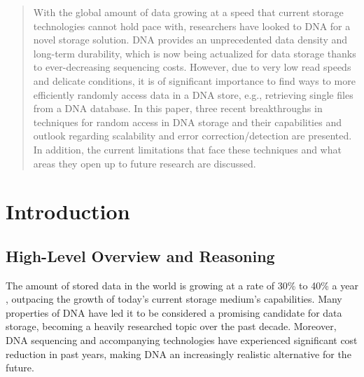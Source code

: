 \documentclass[a4paper,conference]{IEEEtran}
\begin{document}
\begin{abstract}
With the global amount of data growing at a speed that current storage technologies cannot hold pace with, researchers have looked to DNA for a novel storage solution. DNA provides an unprecedented data density and long-term durability, which is now being actualized for data storage thanks to ever-decreasing sequencing costs. However, due to very low read speeds and delicate conditions, it is of significant importance to find ways to more efficiently randomly access data in a DNA store, e.g., retrieving single files from a DNA database. In this paper, three recent breakthroughs in techniques for random access in DNA storage and their capabilities and outlook regarding scalability and error correction/detection are presented. In addition, the current limitations that face these techniques and what areas they open up to future research are discussed.
\end{abstract}





%
\IEEEpeerreviewmaketitle


\section{Introduction}

\subsection{High-Level Overview and Reasoning}


The amount of stored data in the world is growing at a rate of 30\% to 40\% a year \cite{globaldatagrowth}, outpacing the growth of today's current storage medium's capabilities. Many properties of DNA have led it to be considered a promising candidate for data storage, becoming a heavily researched topic over the past decade.  Moreover, DNA sequencing and accompanying technologies have experienced significant cost reduction \cite{dnabasedarchival} in past years, making DNA an increasingly realistic alternative for the future. 
\end{document}
